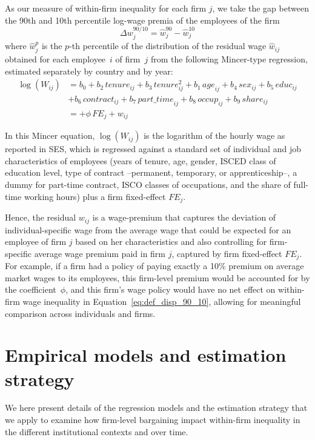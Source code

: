 \documentclass[Review,times,sageh,11pt]{sagej}
\begin{document}
As our measure of within-firm inequality for each firm $j$, we take the gap between the 90th and 10th percentile log-wage premia of the employees of the firm
\begin{equation}
  \label{eq:def_disp_90_10}
  \Delta w^{90/10}_j=\hat{w}^{90}_j - \hat{w}^{10}_j
\end{equation}
\noindent where $\hat{w}^p_j$ is the $p$-th percentile of the distribution of the residual wage $\hat{w}_{ij}$ obtained for each employee~$i$ of firm~$j$ from the following Mincer-type regression, estimated separately by country and by year:
\begin{equation}
\label{eq:mincer}
\begin{split}
\log \left(W_{ij} \right)
&= b_0 + b_2\,\mathit{tenure}_{ij} + b_3\,\mathit{tenure}_{ij}^2 + b_1\,\mathit{age}_{ij} + b_4\,\mathit{sex}_{ij} + b_5\,\mathit{educ}_{ij} \\
&+ b_6\,\mathit{contract}_{ij} + b_7\,\mathit{part\_time}_{ij} + b_8\,\mathit{occup}_{ij} + b_9\,\mathit{share}_{ij} \\
&= + \phi \,\mathit{FE}_j + w_{ij}
\end{split}
\end{equation}

In this Mincer equation, $\log \left(W_{ij} \right)$ is the logarithm of the hourly wage as reported in SES, which is regressed against a standard set of individual and job characteristics of employees (years of tenure, age, gender, ISCED class of education level, type of contract --permanent, temporary, or apprenticeship--, a dummy for part-time contract, ISCO classes of occupations, and the share of full-time working hours) plus a firm fixed-effect $\mathit{FE}_j$. 

Hence, the residual $w_{ij}$ is a wage-premium that captures the deviation of individual-specific wage from the average wage that could be expected for an employee of firm $j$ based on her characteristics and also controlling for firm-specific average wage premium paid in firm $j$, captured by firm fixed-effect $\mathit{FE}_j$. For example, if a firm had a policy of paying exactly a 10\% premium on average market wages to its employees, this firm-level premium would be accounted for by the coefficient~$\phi$, and this firm's wage policy would have no net effect on within-firm wage inequality in Equation~\eqref{eq:def_disp_90_10}, allowing for meaningful comparison across individuals and firms. 


\section*{Empirical models and estimation strategy}
\label{sec:empirics}
We here present details of the regression models and the estimation strategy that we apply to examine how firm-level bargaining impact within-firm inequality in the different institutional contexts and over time.
\end{document}
